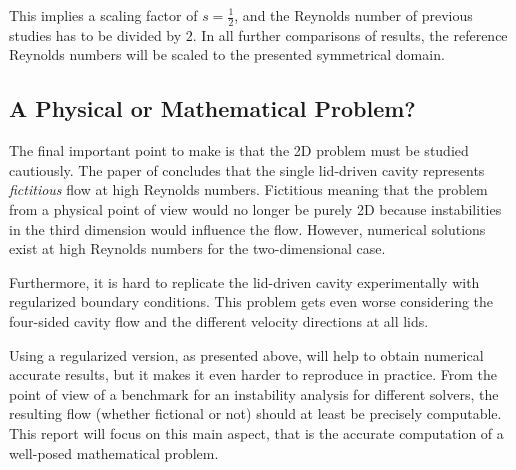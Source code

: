 This implies a scaling factor of $s=\frac{1}{2}$, and the Reynolds number of
previous studies has to be divided by $2$. In all further comparisons of
results, the reference Reynolds numbers will be scaled to the presented
symmetrical domain.

\subsection{A Physical or Mathematical Problem?}

The final important point to make is that the 2D problem must be studied
cautiously. The paper of \cite{eturk2009} concludes that the single lid-driven
cavity represents \emph{fictitious} flow at high Reynolds numbers. Fictitious
meaning that the problem from a physical point of view would no longer be
purely 2D because instabilities in the third dimension would influence the
flow. However, numerical solutions exist at high Reynolds numbers for the
two-dimensional case.

Furthermore, it is hard to replicate the lid-driven cavity experimentally with
regularized boundary conditions. This problem gets even worse considering the
four-sided cavity flow and the different velocity directions at all lids.

Using a regularized version, as presented above, will help to obtain numerical
accurate results, but it makes it even harder to reproduce in practice. From
the point of view of a benchmark for an instability analysis for different
solvers, the resulting flow (whether fictional or not) should at least be
precisely computable. This report will focus on this main aspect, that is the
accurate computation of a well-posed mathematical problem. 
